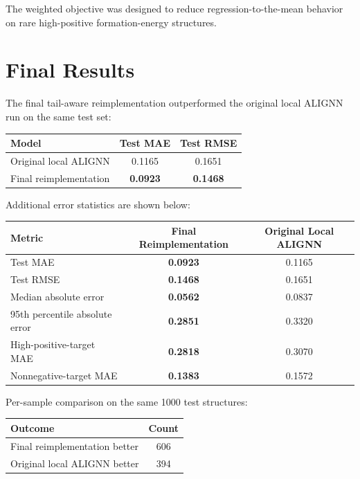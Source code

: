 \documentclass[11pt,a4paper]{article}
\begin{document}
The weighted objective was designed to reduce regression-to-the-mean behavior on rare high-positive formation-energy structures.

\section{Final Results}

The final tail-aware reimplementation outperformed the original local ALIGNN run on the same test set:

\begin{center}
\begin{tabular}{lcc}
\toprule
Model & Test MAE & Test RMSE \\
\midrule
Original local ALIGNN & 0.1165 & 0.1651 \\
Final reimplementation & \textbf{0.0923} & \textbf{0.1468} \\
\bottomrule
\end{tabular}
\end{center}

Additional error statistics are shown below:

\begin{center}
\begin{tabular}{lcc}
\toprule
Metric & Final Reimplementation & Original Local ALIGNN \\
\midrule
Test MAE & \textbf{0.0923} & 0.1165 \\
Test RMSE & \textbf{0.1468} & 0.1651 \\
Median absolute error & \textbf{0.0562} & 0.0837 \\
95th percentile absolute error & \textbf{0.2851} & 0.3320 \\
High-positive-target MAE & \textbf{0.2818} & 0.3070 \\
Nonnegative-target MAE & \textbf{0.1383} & 0.1572 \\
\bottomrule
\end{tabular}
\end{center}

Per-sample comparison on the same 1000 test structures:

\begin{center}
\begin{tabular}{lc}
\toprule
Outcome & Count \\
\midrule
Final reimplementation better & 606 \\
Original local ALIGNN better & 394 \\
\bottomrule
\end{tabular}
\end{center}
\end{document}
